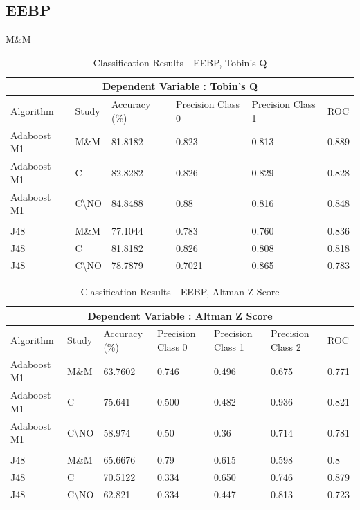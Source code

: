 \clearpage
\subsection*{EEBP}
{M\&M}
\begin{table}[h!]
\centering
\begin{tabular}{ |p{2.5cm}|p{2cm}||p{2.5cm}|p{2cm}|p{2cm}|p{1cm}|  }
 \hline
 \multicolumn{6}{|c|}{Dependent Variable : Tobin's Q} \\
 \hline
 Algorithm & Study & Accuracy (\%) & Precision Class 0 & Precision Class 1 & ROC \\
 \hline
  Adaboost M1  & M\&M &  81.8182     & 0.823 &  0.813 & 0.889  \\
  Adaboost M1 & C & 82.8282  & 0.826 & 0.829  & 0.828  \\
  Adaboost M1 & C\textbackslash NO & 84.8488  & 0.88  & 0.816 & 0.848 \\
 & & & & & \\
 J48  & M\&M & 77.1044  & 0.783 &  0.760 & 0.836  \\
 J48  & C & 81.8182  & 0.826  & 0.808  &  0.818 \\
 J48  & C\textbackslash NO & 78.7879  & 0.7021 & 0.865  & 0.783  \\
 \hline
\end{tabular}
\caption{Classification Results - EEBP, Tobin's Q}
\end{table}

\begin{table}[h]
\begin{tabular}{ |p{2.5cm}|p{1.5cm}||p{2.5cm}|p{1.6cm}|p{1.6cm}|p{1.6cm}|p{1cm}|  }
 \hline
 \multicolumn{7}{|c|}{Dependent Variable : Altman Z Score} \\
 \hline
 Algorithm & Study & Accuracy (\%) & Precision Class 0 & Precision Class 1 & Precision Class 2 & ROC \\
 \hline
 Adaboost M1  & M\&M & 63.7602  & 0.746 &  0.496 & 0.675 & 0.771  \\
 Adaboost M1 & C & 75.641 & 0.500 & 0.482 &  0.936 & 0.821  \\
  Adaboost M1 & C\textbackslash NO & 58.974 & 0.50 & 0.36 & 0.714  & 0.781  \\
   & & & & & &\\
 J48  & M\&M & 65.6676  & 0.79 &  0.615 & 0.598 & 0.8  \\
 J48 & C & 70.5122 & 0.334 & 0.650  & 0.746 & 0.879  \\
 J48  & C\textbackslash NO & 62.821 & 0.334 & 0.447  & 0.813  &  0.723 \\
 \hline
\end{tabular}
\caption{Classification Results  - EEBP, Altman Z Score}
\end{table}









